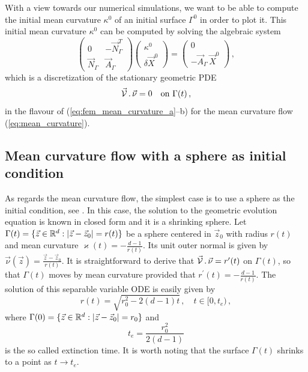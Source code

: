 With a view towards our numerical simulations, we want to be able to compute
the initial mean curvature $\kappa^0$ of an initial surface $\Gamma^0$ in
order to plot it. This initial mean curvature $\kappa^0$ can be computed by
solving the algebraic system
\begin{equation}\label{eq:algebraic_initial_curvature}
\begin{pmatrix}
0 & -\vec N_\Gamma^{T} \\
\vec N_\Gamma & \vec A_\Gamma
\end{pmatrix}
\begin{pmatrix}
\kappa^0 \\
\delta \vec X^0
\end{pmatrix}
=
\begin{pmatrix}
0 \\
- \vec A_\Gamma \, \vec X^0
\end{pmatrix}
\,,
\end{equation}
which is a discretization of the stationary geometric PDE
\begin{equation}
\vec{\mathcal{V}}\,.\,\vec\nu=0\quad\mbox{on }\Gamma(t)\,,
\end{equation}
in the flavour of (\ref{eq:fem_mean_curvature_a}--b) for the mean curvature
flow (\ref{eq:mean_curvature}).

\subsection{Mean curvature flow with a sphere as initial condition}
\label{subsec:mc_sphere}
As regards the mean curvature flow, the simplest case is to use a sphere as the
initial condition, see \cite{Ilmanen98}. In this case, the solution to the
geometric evolution equation is known in closed form and it is a shrinking
sphere. Let $\Gamma(t) = \{ \vec z \in \mathbb R^d : |\vec z -\vec z_0| = r(t) \}$ be
a sphere centered in $\vec z_0$ with radius $r(t)$ and mean curvature
$\varkappa(t) = -\frac{d-1}{r(t)}$. Its unit outer normal is given by
$\vec \nu(\vec z) = \frac{\vec z - \vec z_0}{r(t)}$. It is straightforward to
derive that $\vec{\mathcal{V}}\,.\,\vec\nu = r^\prime(t)$ on $\Gamma(t)$, so that
$\Gamma(t)$ moves by mean curvature provided that $r^\prime(t) = - \frac{d -
1}{r(t)}$. The solution of this separable variable ODE is easily given by
\begin{equation}
r(t) = \sqrt{r_0^2 - 2(d - 1)t}\,, \quad t\in [0,t_e)\,,
\end{equation}
where $\Gamma(0) = \{ \vec z \in \mathbb R^d : |\vec z -\vec z_0| = r_0 \}$ and
\begin{equation}
t_e=\frac{r_0^2}{2(d - 1)}
\end{equation}
is the so called extinction time. It is worth noting that the surface
$\Gamma(t)$ shrinks to a point as $t \to t_e$.

